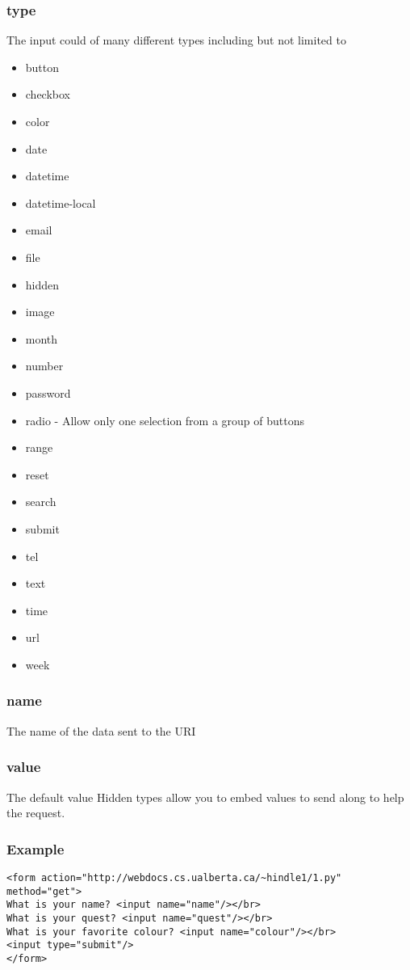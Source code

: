 \documentclass[../CMPUT-404-Notes.tex]{subfiles}
\begin{document}
\subsubsection{type} 
The input could of many different types including but not limited to
\begin{itemize}
  \item button 
  \item checkbox 
  \item color 
  \item date 
  \item datetime 
  \item datetime-local 
  \item email 
  \item file 
  \item hidden 
  \item image 
  \item month 
  \item number 
  \item password 
  \item radio - Allow only one selection from a group of buttons
  \item range 
  \item reset 
  \item search 
  \item submit 
  \item tel 
  \item text 
  \item time 
  \item url 
  \item week
\end{itemize}

\subsubsection{name}
The name of the data sent to the URI
\subsubsection{value}
The default value Hidden types allow you to embed values to send along to help the request. 
\onecolumn
\subsubsection{Example}
\begin{verbatim}
<form action="http://webdocs.cs.ualberta.ca/~hindle1/1.py" method="get">
What is your name? <input name="name"/></br>
What is your quest? <input name="quest"/></br>
What is your favorite colour? <input name="colour"/></br>
<input type="submit"/>
</form>
\end{verbatim}
\end{document}
